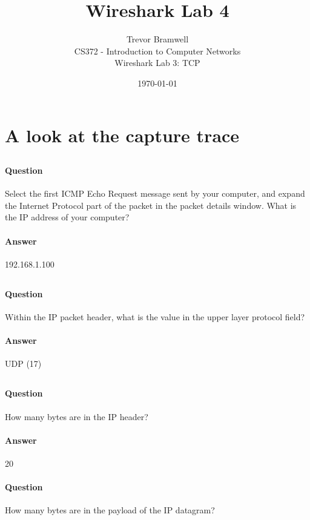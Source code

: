 \documentclass[12pt,letterpaper]{article}
\title{Wireshark Lab 4}
\author{
    Trevor Bramwell \\
    CS372 - Introduction to Computer Networks \\
    Wireshark Lab 3: TCP
}
\date{\today}
\begin{document}
\maketitle

\setcounter{section}{1}
\section{A look at the capture trace}
\subsection{}
\paragraph{Question} Select the first ICMP Echo Request message sent by your
computer, and expand the Internet Protocol part of the packet in the packet
details window. What is the IP address of your computer?
\paragraph{Answer} 192.168.1.100

\subsection{}
\paragraph{Question} Within the IP packet header, what is the value in the
upper layer protocol field?
\paragraph{Answer} UDP (17)

\subsection{}
\paragraph{Question} How many bytes are in the IP header? 
\paragraph{Answer} 20
\paragraph{Question} How many bytes are in the payload of the IP datagram?
\end{document}
